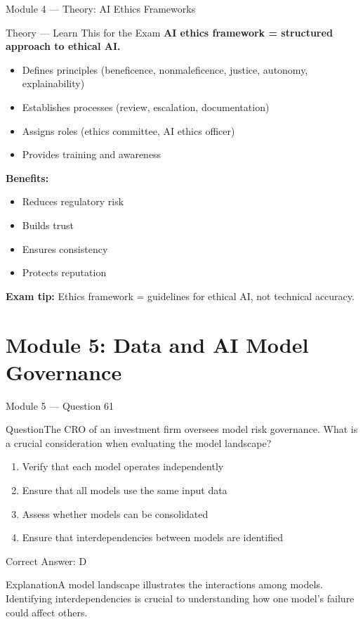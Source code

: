 \documentclass[aspectratio=169,10pt]{beamer}
\newcommand{\question}[1]{\begin{block}{Question}#1\end{block}}
\newcommand{\options}[4]{%
	\begin{enumerate}[label=\Alph*.,leftmargin=*]
		\item #1
		\item #2
		\item #3
		\item #4
	\end{enumerate}
}
\newcommand{\answerbox}[1]{\begin{exampleblock}{Correct Answer: #1}\end{exampleblock}}
\newcommand{\explain}[1]{\begin{block}{Explanation}#1\end{block}}
\newcommand{\theory}[1]{%
	\begin{block}{Theory --- Learn This for the Exam}
		\small #1
	\end{block}
}
\begin{document}
	\begin{frame}{Module 4 --- Theory: AI Ethics Frameworks}
		\theory{
			\textbf{AI ethics framework = structured approach to ethical AI.}
			\begin{itemize}
				\item Defines principles (beneficence, nonmaleficence, justice, autonomy, explainability)
				\item Establishes processes (review, escalation, documentation)
				\item Assigns roles (ethics committee, AI ethics officer)
				\item Provides training and awareness
			\end{itemize}
			\textbf{Benefits:}
			\begin{itemize}
				\item Reduces regulatory risk
				\item Builds trust
				\item Ensures consistency
				\item Protects reputation
			\end{itemize}
			\textbf{Exam tip:} Ethics framework = guidelines for ethical AI, not technical accuracy.
		}
	\end{frame}
	
	\section{Module 5: Data and AI Model Governance}
	
	\begin{frame}{Module 5 --- Question 61}
		\question{The CRO of an investment firm oversees model risk governance. What is a crucial consideration when evaluating the model landscape?}
		\options{Verify that each model operates independently}{Ensure that all models use the same input data}{Assess whether models can be consolidated}{Ensure that interdependencies between models are identified}
		\answerbox{D}
		\explain{A model landscape illustrates the interactions among models. Identifying interdependencies is crucial to understanding how one model's failure could affect others.}
	\end{frame}
	
\end{document}

